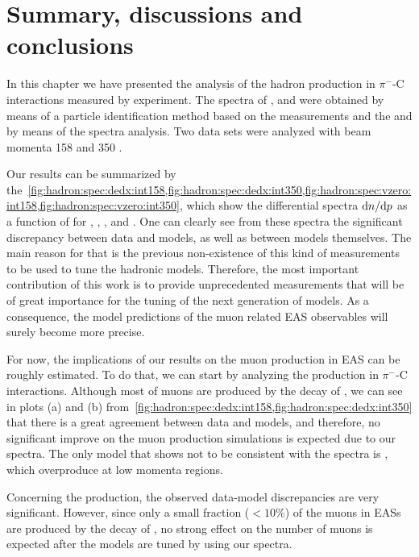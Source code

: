 \section{Summary, discussions and conclusions}
\label{sec:hadron:conclusions}

In this chapter we have presented the
analysis of the hadron production in $\pi^-$-C interactions
measured by \NASixtyOne experiment. 
The spectra of \pions, \kaons and \protonpm were obtained by
means of a particle identification method based on the
\dedx measurements and the \lambs and \kzeros by means
of the \minv spectra analysis. Two data sets
were analyzed with beam momenta 158 and 350 \GeVc.

Our results can be summarized by
the~\cref{fig:hadron:spec:dedx:int158,fig:hadron:spec:dedx:int350,fig:hadron:spec:vzero:int158,fig:hadron:spec:vzero:int350}, which show the differential spectra $\text{d}n/\text{d}p$
as a function of \pp for \pions, \kaons, \protonpm, \lambs and \kzeros.
One can clearly see from these spectra
the significant discrepancy between data and models,
as well as between models themselves. 
The main reason for that is the previous non-existence
of this kind of measurements to be used to tune
the hadronic models. Therefore, the most important
contribution of this work is to provide unprecedented
measurements that will be of great importance
for the tuning of the next generation of models.
As a consequence, the model predictions of the muon related
EAS observables will surely become more precise.

For now, the implications of our results on the muon
production in EAS can be roughly estimated.
To do that, we can start by analyzing the \pions production
in $\pi^{-}$-C interactions. Although most of muons are
produced by the decay of \pions, we can see in plots
(a) and (b) from~\cref{fig:hadron:spec:dedx:int158,fig:hadron:spec:dedx:int350}
that there is a great agreement between data and models,
and therefore, no significant improve on the muon
production simulations is expected due to our \pions spectra.  
The only model that shows not to be consistent
with the \pions spectra is \DPMJetLong, which overproduce
\pions at low momenta regions.

Concerning the \kaons production, the observed data-model
discrepancies are very significant. However,
since only a small fraction ($<10\%$) of the muons in
EASs are produced by the decay of \kaons,
no strong effect on the number of muons is expected
after the models are tuned by using our \kaons spectra.

